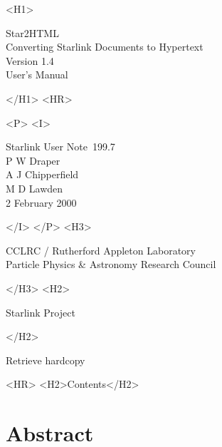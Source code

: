 \documentclass[twoside,11pt]{article}
\newcommand{\stardoccategory}  {Starlink User Note}
\newcommand{\stardocsource}    {sun\stardocnumber}
\newcommand{\stardocnumber}    {199.7}
\newcommand{\stardocauthors}   {P W Draper\\
                                A J Chipperfield\\
                                M D Lawden}
\newcommand{\stardocdate}      {2 February 2000}
\newcommand{\stardoctitle}     {Star2HTML\\[1ex]
                                Converting Starlink Documents to Hypertext}
\newcommand{\stardocversion}   {Version 1.4}
\newcommand{\stardocmanual}    {User's Manual}
\newcommand{\htmladdnormallink}[2]{#1}
\newcommand{\htmladdimg}[1]{}
\newcommand{\htmlref}[2]{#1}
\newcommand{\htmladdtonavigation}[1]{}
\newcommand{\xlabel}[1]{}
\renewcommand{\_}{\texttt{\symbol{95}}}
\begin{document}
\begin{htmlonly}
   \xlabel{}
   \begin{rawhtml} <H1> \end{rawhtml}
      \stardoctitle\\
      \stardocversion\\
      \stardocmanual
   \begin{rawhtml} </H1> <HR> \end{rawhtml}


   \begin{rawhtml} <P> <I> \end{rawhtml}
   \stardoccategory\ \stardocnumber \\
   \stardocauthors \\
   \stardocdate
   \begin{rawhtml} </I> </P> <H3> \end{rawhtml}
      \htmladdnormallink{CCLRC / Rutherford Appleton Laboratory}
                        {http://www.cclrc.ac.uk} \\
      \htmladdnormallink{Particle Physics \& Astronomy Research Council}
                        {http://www.pparc.ac.uk} \\
   \begin{rawhtml} </H3> <H2> \end{rawhtml}
      \htmladdnormallink{Starlink Project}{http://www.starlink.rl.ac.uk/}
   \begin{rawhtml} </H2> \end{rawhtml}
   \htmladdnormallink{\htmladdimg{source.gif} Retrieve hardcopy}
      {http://www.starlink.rl.ac.uk/cgi-bin/hcserver?\stardocsource}\\

  \label{stardoccontents}
  \begin{rawhtml}
    <HR>
    <H2>Contents</H2>
  \end{rawhtml}
  \htmladdtonavigation{\htmlref{\htmladdimg{contents_motif.gif}}
        {stardoccontents}}

  \section{\xlabel{abstract}Abstract}
\end{htmlonly}
\end{document}
